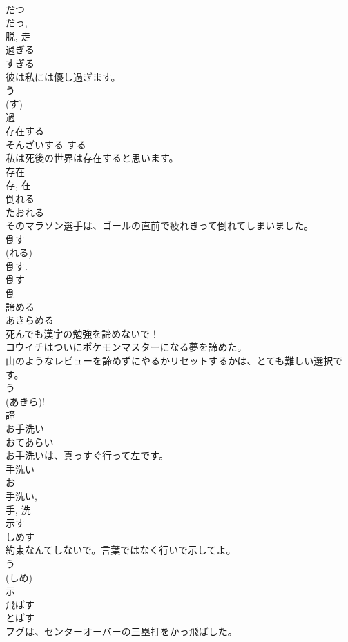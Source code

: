 \documentclass[8pt]{extreport}
\begin{document}
\begin{CJK}{UTF8}{min}
\\	だつ 
\\	だっ, 
\\	脱, 走	
\\	過ぎる	
\\	すぎる	
\\	彼は私には優し過ぎます。	
\\	う 
\\	(す) 
\\	過	
\\	存在する	
\\	そんざいする	する 
\\	私は死後の世界は存在すると思います。	
\\	存在 
\\	存, 在	
\\	倒れる	
\\	たおれる	
\\	そのマラソン選手は、ゴールの直前で疲れきって倒れてしまいました。	
\\	倒す 
\\	(れる) 
\\	倒す. 
\\	倒す 
\\	倒	
\\	諦める	
\\	あきらめる	
\\	死んでも漢字の勉強を諦めないで！	
\\	コウイチはついにポケモンマスターになる夢を諦めた。	
\\	山のようなレビューを諦めずにやるかリセットするかは、とても難しい選択です。	
\\	う 
\\	(あきら)!
\\	諦	
\\	お手洗い	
\\	おてあらい	
\\	お手洗いは、真っすぐ行って左です。	
\\	手洗い 
\\	お 
\\	手洗い, 
\\	手, 洗	
\\	示す	
\\	しめす	
\\	約束なんてしないで。言葉ではなく行いで示してよ。	
\\	う 
\\	(しめ) 
\\	示	
\\	飛ばす	
\\	とばす	
\\	フグは、センターオーバーの三塁打をかっ飛ばした。	

\end{CJK}
\end{document}
